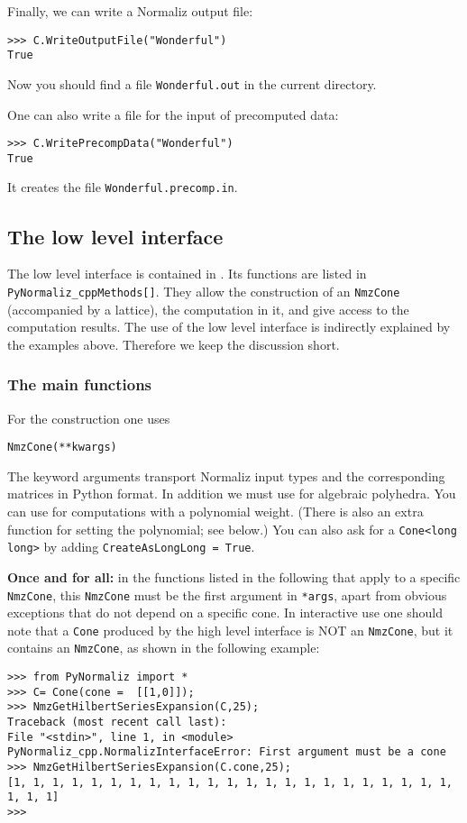 \begin{small}
Finally, we can write a Normaliz output file:
\begin{Verbatim}
>>> C.WriteOutputFile("Wonderful")
True
\end{Verbatim}
Now you should find a file \verb|Wonderful.out| in the current directory.

One can also write a file for the input of precomputed data:
\begin{Verbatim}
>>> C.WritePrecompData("Wonderful")
True
\end{Verbatim}
It creates the file \verb|Wonderful.precomp.in|.

\subsection{The low level interface}

The low level interface is contained in . Its functions are listed in\\ \verb|PyNormaliz_cppMethods[]|. They allow the construction of an \verb|NmzCone| (accompanied by a lattice), the computation in it, and give access to the computation results. The use of the low level interface is indirectly explained by the examples above. Therefore we keep the discussion short.

\subsubsection{The main functions}

For the construction one uses
\begin{Verbatim}
NmzCone(**kwargs)
\end{Verbatim}
The keyword arguments  transport Normaliz input types and the corresponding matrices in Python format. In addition we must use  for algebraic polyhedra. You can use  for computations with a polynomial weight. (There is also an extra function for setting the polynomial; see below.) You can also ask for a \verb|Cone<long long>| by adding \verb|CreateAsLongLong = True|.

\textbf{Once and for all:} in the functions listed in the following that apply to a specific \verb|NmzCone|, this \verb|NmzCone| must be the first argument in \verb|*args|, apart from obvious exceptions that do not depend on a specific cone. In interactive use one should note that a \verb*|Cone| produced by the high level interface is NOT an \verb*|NmzCone|, but it contains an \verb*|NmzCone|, as shown in the following example:
\begin{Verbatim}
>>> from PyNormaliz import *
>>> C= Cone(cone =  [[1,0]]);
>>> NmzGetHilbertSeriesExpansion(C,25);
Traceback (most recent call last):
File "<stdin>", line 1, in <module>
PyNormaliz_cpp.NormalizInterfaceError: First argument must be a cone
>>> NmzGetHilbertSeriesExpansion(C.cone,25);
[1, 1, 1, 1, 1, 1, 1, 1, 1, 1, 1, 1, 1, 1, 1, 1, 1, 1, 1, 1, 1, 1, 1, 1, 1, 1]
>>> 
\end{Verbatim}


\end{small}
